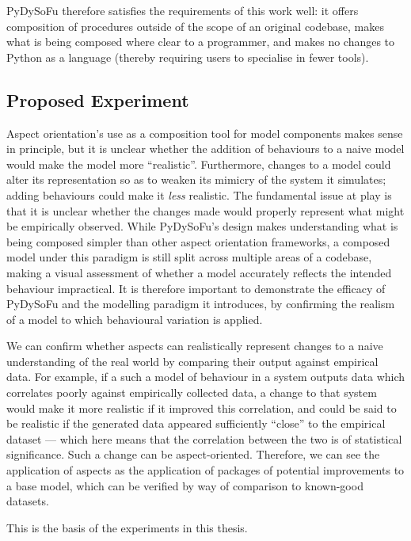 PyDySoFu therefore satisfies the requirements of this work well: it offers
composition of procedures outside of the scope of an original codebase, makes
what is being composed where clear to a programmer, and makes no
changes to Python as a language (thereby requiring users to specialise in fewer
tools). 


\subsection{Proposed Experiment}\label{subsec:optimisation_with_aspects_experiment}

Aspect orientation's use as a composition tool for model components makes sense
in principle, but it is unclear whether the addition of behaviours to a naive
model would make the model more ``realistic''. Furthermore, changes to a model
could alter its representation so as to weaken its mimicry of the system it
simulates; adding behaviours could make it \emph{less} realistic. The
fundamental issue at play is that it is unclear whether the changes made would
properly represent what might be empirically observed. While PyDySoFu's design
makes understanding what is being composed simpler than other aspect orientation
frameworks, a composed model under this paradigm is still split across multiple
areas of a codebase, making a visual assessment of whether a model accurately
reflects the intended behaviour impractical. It is therefore important to
demonstrate the efficacy of PyDySoFu and the modelling paradigm it introduces,
by confirming the realism of a model to which behavioural variation is applied.

We can confirm whether aspects can realistically represent changes to a naive
understanding of the real world by comparing their output against empirical
data. For example, if a such a model of behaviour in a system outputs data which
correlates poorly against empirically collected data, a change to that system
would make it more realistic if it improved this correlation, and could be said
to be realistic if the generated data appeared sufficiently ``close'' to the
empirical dataset --- which here means that the correlation between the two is
of statistical significance. Such a change can be aspect-oriented. Therefore, we
can see the application of aspects as the application of packages of potential
improvements to a base model, which can be verified by way of comparison to
known-good datasets.

This is the basis of the experiments in this thesis.

